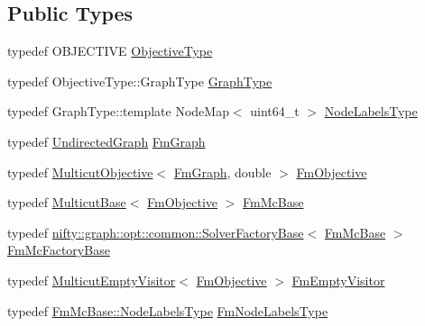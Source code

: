\subsection*{Public Types}
\begin{DoxyCompactItemize}
\item 
typedef O\+B\+J\+E\+C\+T\+I\+VE \hyperlink{classnifty_1_1graph_1_1opt_1_1multicut_1_1FusionMove_ab700a686e5eff05008757b9a2b707111}{Objective\+Type}
\item 
typedef Objective\+Type\+::\+Graph\+Type \hyperlink{classnifty_1_1graph_1_1opt_1_1multicut_1_1FusionMove_a5ca6545570a555e7aabf3fc76db45897}{Graph\+Type}
\item 
typedef Graph\+Type\+::template Node\+Map$<$ uint64\+\_\+t $>$ \hyperlink{classnifty_1_1graph_1_1opt_1_1multicut_1_1FusionMove_ab3ca32ed58ba78fca785dc50cd4baedf}{Node\+Labels\+Type}
\item 
typedef \hyperlink{classnifty_1_1graph_1_1UndirectedGraph}{Undirected\+Graph} \hyperlink{classnifty_1_1graph_1_1opt_1_1multicut_1_1FusionMove_ad227dff7da1c30c888980d3ab332fd2c}{Fm\+Graph}
\item 
typedef \hyperlink{classnifty_1_1graph_1_1opt_1_1multicut_1_1MulticutObjective}{Multicut\+Objective}$<$ \hyperlink{classnifty_1_1graph_1_1opt_1_1multicut_1_1FusionMove_ad227dff7da1c30c888980d3ab332fd2c}{Fm\+Graph}, double $>$ \hyperlink{classnifty_1_1graph_1_1opt_1_1multicut_1_1FusionMove_a024e1871ed861501626de8e65dfa31a6}{Fm\+Objective}
\item 
typedef \hyperlink{classnifty_1_1graph_1_1opt_1_1multicut_1_1MulticutBase}{Multicut\+Base}$<$ \hyperlink{classnifty_1_1graph_1_1opt_1_1multicut_1_1FusionMove_a024e1871ed861501626de8e65dfa31a6}{Fm\+Objective} $>$ \hyperlink{classnifty_1_1graph_1_1opt_1_1multicut_1_1FusionMove_a5597cadb798f8e4ef8ef5f7c71871aa5}{Fm\+Mc\+Base}
\item 
typedef \hyperlink{classnifty_1_1graph_1_1opt_1_1common_1_1SolverFactoryBase}{nifty\+::graph\+::opt\+::common\+::\+Solver\+Factory\+Base}$<$ \hyperlink{classnifty_1_1graph_1_1opt_1_1multicut_1_1FusionMove_a5597cadb798f8e4ef8ef5f7c71871aa5}{Fm\+Mc\+Base} $>$ \hyperlink{classnifty_1_1graph_1_1opt_1_1multicut_1_1FusionMove_a45f5161fca8c8c92187acd749dd13662}{Fm\+Mc\+Factory\+Base}
\item 
typedef \hyperlink{namespacenifty_1_1graph_1_1opt_1_1multicut_aa5367b6f47794a63333b96b04502396c}{Multicut\+Empty\+Visitor}$<$ \hyperlink{classnifty_1_1graph_1_1opt_1_1multicut_1_1FusionMove_a024e1871ed861501626de8e65dfa31a6}{Fm\+Objective} $>$ \hyperlink{classnifty_1_1graph_1_1opt_1_1multicut_1_1FusionMove_a6d3c7094e63b5ae54f305761e0416f5e}{Fm\+Empty\+Visitor}
\item 
typedef \hyperlink{classnifty_1_1graph_1_1opt_1_1common_1_1SolverBase_abefd51561de2fd009f6bed6bef6009ea}{Fm\+Mc\+Base\+::\+Node\+Labels\+Type} \hyperlink{classnifty_1_1graph_1_1opt_1_1multicut_1_1FusionMove_a4248d08e5e17ec029fc4fd4ef84a4bd9}{Fm\+Node\+Labels\+Type}
\end{DoxyCompactItemize}
